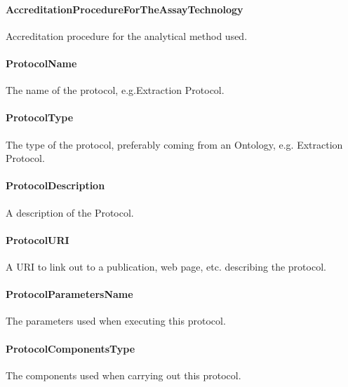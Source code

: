 \documentclass[a4paper]{report}
\begin{document}
\paragraph{AccreditationProcedureForTheAssayTechnology}
Accreditation procedure for the analytical method used.

\paragraph{ProtocolName}
The name of the protocol, e.g.Extraction Protocol.

\paragraph{ProtocolType}
The type of the protocol, preferably coming from an Ontology, e.g. Extraction Protocol.

\paragraph{ProtocolDescription}
A description of the Protocol.

\paragraph{ProtocolURI}
A URI to link out to a publication, web page, etc. describing the protocol.

\paragraph{ProtocolParametersName}
The parameters used when executing this protocol.

\paragraph{ProtocolComponentsType}
The components used when carrying out this protocol.
\end{document}
